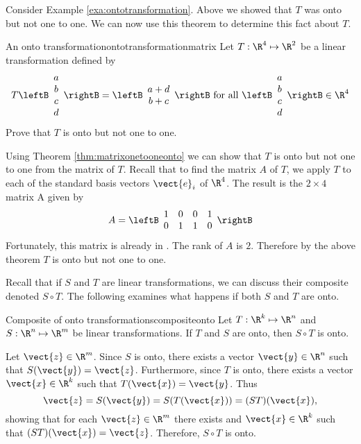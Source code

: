 Consider Example \ref{exa:ontotransformation}. Above we showed that $T$ was onto but not one to one. We can now use this theorem to determine this fact about $T$. 

\begin{example}{An onto transformation}{ontotransformationmatrix}
Let $T: \R^4 \mapsto \R^2$ be a linear transformation defined by
\[
T \leftB \begin{array}{c}
a \\
b \\
c \\
d
\end{array}
\rightB = 
\leftB \begin{array}{c}
a + d \\
b + c 
\end{array}
\rightB
\mbox{ for all } \leftB \begin{array}{c}
a \\
b \\
c \\
d
\end{array}
\rightB \in \R^4
\]
Prove that $T$ is onto but not one to one.
\end{example}

\begin{solution}
Using Theorem \ref{thm:matrixonetooneonto} we can show that $T$ is onto but not one to one from the matrix of $T$. Recall that to find the matrix $A$ of $T$, we apply $T$ to each of the standard basis vectors $\vect{e}_i$ of $\R^4$. The result is the $2 \times 4$ matrix A given by 
\[
A = \leftB \begin{array}{rrrr}
1 & 0 & 0 & 1 \\
0 & 1 & 1 & 0 
\end{array} \rightB
\]
Fortunately, this matrix is already in {\rref}. The rank of $A$ is $2$. Therefore by the above theorem $T$ is onto but not one to one. 
\end{solution}

Recall that if $S$ and $T$ are linear transformations, we can discuss their composite denoted $S \circ T$. The following examines what happens if both $S$ and $T$ are onto. 

\begin{example}{Composite of onto transformations}{compositeonto}
Let $T: \R^k \mapsto \R^n$ and $S: \R^n \mapsto \R^m$ be linear transformations. 
If $T$ and $S$ are onto, then $S \circ T$ is onto.
\end{example}

\begin{solution}
Let $\vect{z}\in \R^m$.  
Since $S$ is onto, there exists a vector $\vect{y}\in \R^n$
such that $S(\vect{y})=\vect{z}$.
Furthermore, since $T$ is onto, there exists a vector $\vect{x}\in \R^k$
such that $T(\vect{x})=\vect{y}$.
Thus
\[ \vect{z} = S(\vect{y}) = S(T(\vect{x})) = (ST)(\vect{x}),\]
showing that for each $\vect{z}\in \R^m$ there exists and $\vect{x}\in \R^k$
such that $(ST)(\vect{x})=\vect{z}$.
Therefore, $S \circ T$ is onto.
\end{solution}

